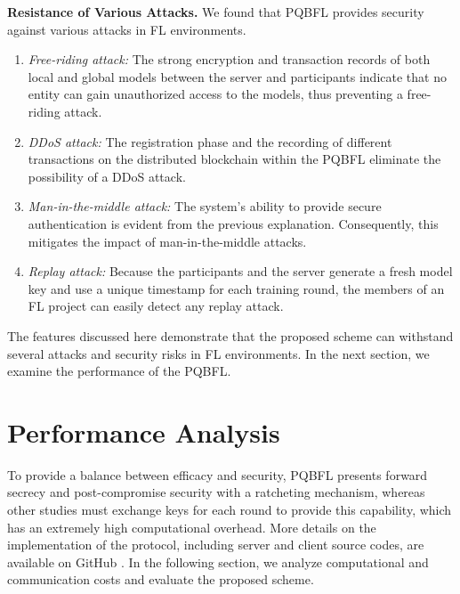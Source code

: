 \documentclass[a4paper,fleqn]{cas-dc}
\begin{document}
\noindent\textbf{Resistance of Various Attacks.}
We found that PQBFL provides security against various attacks in FL environments.
\begin{enumerate}
    \item \textit{Free-riding attack:} The strong encryption and transaction records of both local and global models between the server and participants indicate that no entity can gain unauthorized access to the models, thus preventing a free-riding attack.
    \item \textit{DDoS attack:} The registration phase and the recording of different transactions on the distributed blockchain within the PQBFL eliminate the possibility of a DDoS attack.
    \item \textit{Man-in-the-middle attack:} The system's ability to provide secure authentication is evident from the previous explanation. 
    Consequently, this mitigates the impact of man-in-the-middle attacks.
    \item \textit{Replay attack:} Because the participants and the server generate a fresh model key and use a unique timestamp for each training round, the members of an FL project can easily detect any replay attack.
\end{enumerate}

The features discussed here demonstrate that the proposed scheme can withstand several attacks and security risks in FL environments. 
In the next section, we examine the performance of the PQBFL.

\section{Performance Analysis}
\label{Performance Analysis}
To provide a balance between efficacy and security, PQBFL presents forward secrecy and post-compromise security with a ratcheting mechanism, whereas other studies must exchange keys for each round to provide this capability, which has an extremely high computational overhead.
More details on the implementation of the protocol, including server and client source codes, are available on GitHub \citep{source_code}. 
In the following section, we analyze computational and communication costs and evaluate the proposed scheme. 
 
\end{document}
